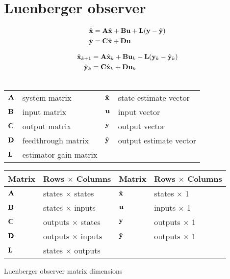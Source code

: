 \section{Luenberger observer}

\begin{theorem}
  \begin{align}
    \dot{\hat{\mathbf{x}}} &= \mathbf{A}\hat{\mathbf{x}} + \mathbf{B}\mathbf{u} +
      \mathbf{L} (\mathbf{y} - \hat{\mathbf{y}}) \label{eq:s_obsv_x} \\
    \hat{\mathbf{y}} &= \mathbf{C}\hat{\mathbf{x}} + \mathbf{D}\mathbf{u} \label{eq:s_obsv_y}
  \end{align}

  \begin{align}
    \hat{\mathbf{x}}_{k+1} &= \mathbf{A}\hat{\mathbf{x}}_k + \mathbf{B}\mathbf{u}_k +
      \mathbf{L}(\mathbf{y}_k - \hat{\mathbf{y}}_k) \label{eq:z_obsv_x} \\
    \hat{\mathbf{y}}_k &= \mathbf{C}\hat{\mathbf{x}}_k + \mathbf{D}\mathbf{u}_k
      \label{eq:z_obsv_y} \\ \nonumber
  \end{align}

  \begin{figurekey}
    \begin{tabulary}{\linewidth}{LLLL}
      $\mathbf{A}$ & system matrix      & $\hat{\mathbf{x}}$ & state estimate vector \\
      $\mathbf{B}$ & input matrix       & $\mathbf{u}$ & input vector \\
      $\mathbf{C}$ & output matrix      & $\mathbf{y}$ & output vector \\
      $\mathbf{D}$ & feedthrough matrix & $\hat{\mathbf{y}}$ & output estimate vector \\
      $\mathbf{L}$ & estimator gain matrix & & \\
    \end{tabulary}
  \end{figurekey}
\end{theorem}

\begin{booktable}
  \begin{tabular}{|ll|ll|}
    \hline
    \rowcolor{headingbg}
    \textbf{Matrix} & \textbf{Rows $\times$ Columns} &
    \textbf{Matrix} & \textbf{Rows $\times$ Columns} \\
    \hline
    $\mathbf{A}$ & states $\times$ states & $\hat{\mathbf{x}}$ & states $\times$ 1 \\
    $\mathbf{B}$ & states $\times$ inputs & $\mathbf{u}$ & inputs $\times$ 1 \\
    $\mathbf{C}$ & outputs $\times$ states & $\mathbf{y}$ & outputs $\times$ 1 \\
    $\mathbf{D}$ & outputs $\times$ inputs & $\hat{\mathbf{y}}$ & outputs $\times$ 1 \\
    $\mathbf{L}$ & states $\times$ outputs & & \\
    \hline
  \end{tabular}
  \caption{Luenberger observer matrix dimensions}
  \label{tab:luenberger_matrix_dims}
\end{booktable}

